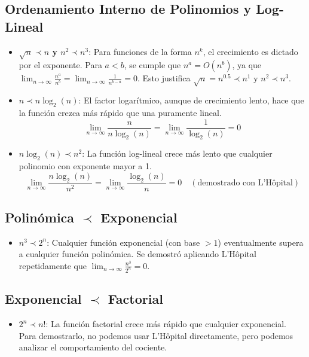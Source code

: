 \documentclass[12pt, a4paper]{article}
\theoremstyle{definition}
\begin{document}
\subsection{Ordenamiento Interno de Polinomios y Log-Lineal}
\begin{itemize}
    \item \textbf{$\sqrt{n} \prec n$ y $n^2 \prec n^3$}: Para funciones de la forma $n^k$, el crecimiento es dictado por el exponente. Para $a < b$, se cumple que $n^a = O(n^b)$, ya que $\lim_{n \to \infty} \frac{n^a}{n^b} = \lim_{n \to \infty} \frac{1}{n^{b-a}} = 0$. Esto justifica $\sqrt{n} = n^{0.5} \prec n^1$ y $n^2 \prec n^3$.
    
    \item \textbf{$n \prec n \log_2(n)$}: El factor logarítmico, aunque de crecimiento lento, hace que la función crezca más rápido que una puramente lineal.
    \[ \lim_{n \to \infty} \frac{n}{n \log_2(n)} = \lim_{n \to \infty} \frac{1}{\log_2(n)} = 0 \]
    
    \item \textbf{$n \log_2(n) \prec n^2$}: La función log-lineal crece más lento que cualquier polinomio con exponente mayor a 1.
    \[ \lim_{n \to \infty} \frac{n \log_2(n)}{n^2} = \lim_{n \to \infty} \frac{\log_2(n)}{n} = 0 \quad (\text{demostrado con L'Hôpital}) \]
\end{itemize}

\subsection{Polinómica $\prec$ Exponencial}
\begin{itemize}
    \item \textbf{$n^3 \prec 2^n$}: Cualquier función exponencial (con base $> 1$) eventualmente supera a cualquier función polinómica. Se demostró aplicando L'Hôpital repetidamente que $\lim_{n \to \infty} \frac{n^3}{2^n} = 0$.
\end{itemize}

\subsection{Exponencial $\prec$ Factorial}
\begin{itemize}
    \item \textbf{$2^n \prec n!$}: La función factorial crece más rápido que cualquier exponencial. Para demostrarlo, no podemos usar L'Hôpital directamente, pero podemos analizar el comportamiento del cociente.
\end{itemize}
\end{document}
